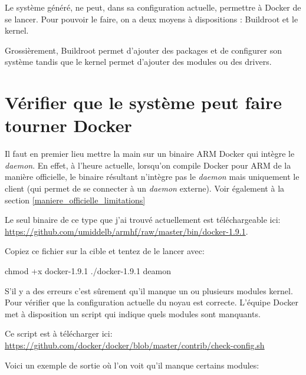 \documentclass[11pt,a4paper,oneside]{report}
\begin{document}
Le système généré, ne peut, dans sa configuration actuelle, permettre à Docker de se lancer. Pour pouvoir le faire, on a deux moyens à dispositions : Buildroot et le kernel.

Grossièrement, Buildroot permet d'ajouter des packages et de configurer son système tandis que le kernel permet d'ajouter des modules ou des drivers.

\section{Vérifier que le système peut faire tourner Docker}

Il faut en premier lieu mettre la main sur un binaire ARM Docker qui intègre le \emph{daemon}. En effet, à l'heure actuelle, lorsqu'on compile Docker pour ARM de la manière officielle, le binaire résultant n'intègre pas le \emph{daemon} mais uniquement le client (qui permet de se connecter à un \emph{daemon} externe). Voir également à la section \ref{maniere_officielle_limitations}

Le seul binaire de ce type que j'ai trouvé actuellement est téléchargeable ici: \url{https://github.com/umiddelb/armhf/raw/master/bin/docker-1.9.1}.

Copiez ce fichier sur la cible et tentez de le lancer avec:

\begin{bashcode}
chmod +x docker-1.9.1
./docker-1.9.1 deamon
\end{bashcode}

S'il y a des erreurs c'est sûrement qu'il manque un ou plusieurs modules kernel. Pour vérifier que la configuration actuelle du noyau est correcte. L'équipe Docker met à disposition un script qui indique quels modules sont manquants.

Ce script est à télécharger ici: \url{https://github.com/docker/docker/blob/master/contrib/check-config.sh}

\newpage
Voici un exemple de sortie où l'on voit qu'il manque certains modules:
\end{document}
